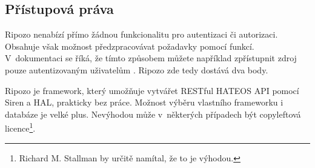 \subsection{Přístupová práva}\label{pux159uxedstupovuxe1-pruxe1va}

Ripozo nenabízí přímo žádnou funkcionalitu pro autentizaci či autorizaci. Obsahuje však možnost předzpracovávat požadavky pomocí funkcí. V~dokumentaci se říká, že tímto způsobem můžete například zpřístupnit zdroj pouze autentizovaným uživatelům \autocite{ripozoprepost}. Ripozo zde tedy dostává dva body.

Ripozo je framework, který umožňuje vytvářet RESTful HATEOS API pomocí Siren a HAL, prakticky bez práce. Možnost výběru vlastního frameworku i databáze je velké plus. Nevýhodou může v~některých případech být copyleftová licence\footnote{Richard M. Stallman by určitě namítal, že to je výhodou.}.
